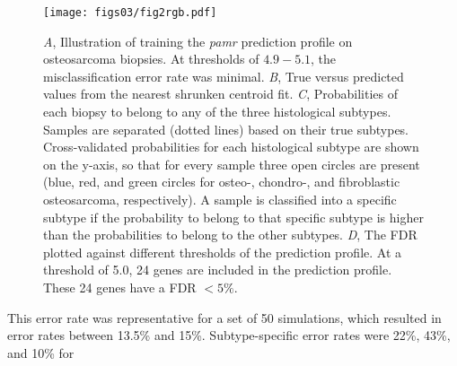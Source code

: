 \begin{figure}[htbp]
	\centering
	\texttt{[image: figs03/fig2rgb.pdf]}	%
	 	\caption{{\it A}, Illustration of training the {\it pamr} prediction profile on osteosarcoma biopsies. At thresholds of $4.9-5.1$, the misclassification error rate was minimal. {\it B}, True versus predicted values from the nearest shrunken centroid fit. {\it C}, Probabilities of each biopsy to belong to any of the three histological subtypes. Samples are separated (dotted lines) based on their true subtypes. Cross\hyp{}validated probabilities for each histological subtype are shown on the y-axis, so that for every sample three open circles are present (blue, red, and green circles for \mbox{osteo-,} chondro-, and fibroblastic osteosarcoma, respectively). A sample is classified into a specific subtype if the probability to belong to that specific subtype is higher than the probabilities to belong to the other subtypes. {\it D}, The FDR plotted against different thresholds of the prediction profile. At a threshold of 5.0, 24 genes are included in the prediction profile. These 24 genes have a FDR $< 5\%$.} %
	\label{fig3.2}
\end{figure}
%
This error
rate was representative for a set of 50 simulations,
which resulted in error rates between 13.5\% and 15\%.
Subtype\hyp{}specific error rates were 22\%, 43\%, and 10\% for
